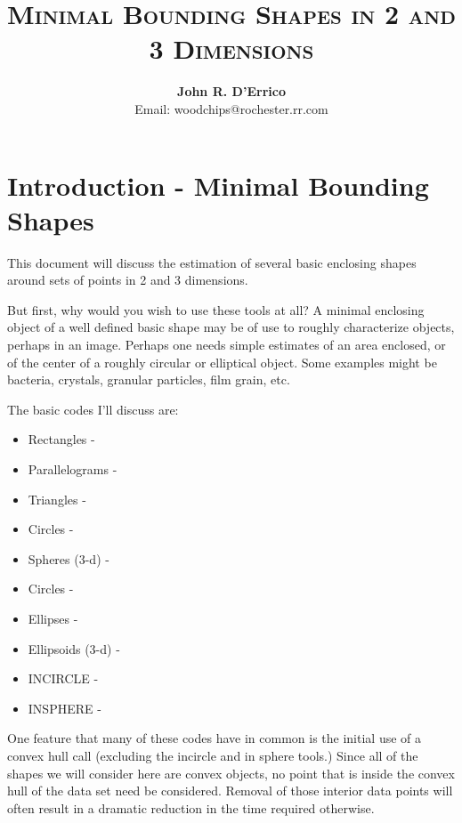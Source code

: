 \documentclass[a4paper,11pt]{article}
\begin{document}

\title{\textsc{Minimal Bounding Shapes in 2 and 3 Dimensions}}

\author{\textbf{John R. D'Errico}\\
Email: woodchips@rochester.rr.com}

\maketitle

\section{Introduction - Minimal Bounding Shapes}

This document will discuss the estimation of several basic enclosing shapes around
sets of points in 2 and 3 dimensions.

But first, why would you wish to use these tools at all? A minimal enclosing object of
a well defined basic shape may be of use to roughly characterize objects, perhaps in an 
image. Perhaps one needs simple estimates of an area enclosed, or of the center of a
roughly circular or elliptical object. Some examples might be bacteria, crystals, granular
particles, film grain, etc.

The basic codes I'll discuss are:

\begin{itemize}
  \item Rectangles - 
  \item Parallelograms - 
  \item Triangles - 
  \item Circles - 
  \item Spheres (3-d) - 
  \item Circles - 
  \item Ellipses - 
  \item Ellipsoids (3-d) - 
  \item INCIRCLE - 
  \item INSPHERE - 
\end{itemize}

One feature that many of these codes have in common is the initial use of a convex
hull call (excluding the incircle and in sphere tools.) Since all of the shapes we will consider here are convex objects, no point that is inside the convex hull of the data set need be considered. Removal of those interior data points will often result in a dramatic reduction in the time required otherwise.
\end{document}
